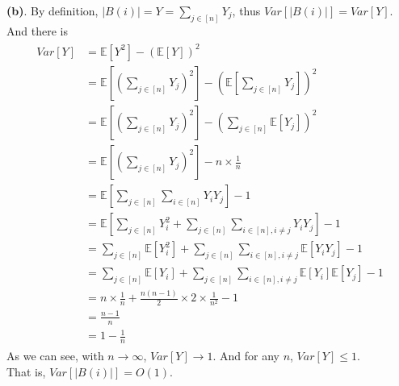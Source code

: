 \documentclass[titlepage, paper=a4, fontsize=11pt]{scrartcl} %
\numberwithin{equation}{section} %
\numberwithin{figure}{section} %
\numberwithin{table}{section} %
\begin{document}
\textbf{(b)}. By definition, $|B(i)| = Y = \sum_{j \in [n]} Y_j$, thus $Var[|B(i)|] = Var[Y]$. And there is \\
\begin{align*} 
\begin{split}
Var[Y] &= \mathbb{E}[Y^2] - (\mathbb{E}[Y])^2 \\
&= \mathbb{E}[(\sum_{j \in [n]} Y_j)^2] - (\mathbb{E}[\sum_{j \in [n]} Y_j])^2 \\
&= \mathbb{E}[(\sum_{j \in [n]} Y_j)^2] - (\sum_{j \in [n]} \mathbb{E}[Y_j])^2 \\
&= \mathbb{E}[(\sum_{j \in [n]} Y_j)^2] - n \times \frac{1}{n} \\
&= \mathbb{E}[\sum_{j \in [n]}\sum_{i \in [n]} Y_iY_j] - 1 \\
&= \mathbb{E}[\sum_{j \in [n]} Y_i^2 + \sum_{j \in [n]}\sum_{i \in [n], i \neq j} Y_iY_j] - 1 \\
&= \sum_{j \in [n]}\mathbb{E}[Y_i^2] + \sum_{j \in [n]}\sum_{i \in [n], i \neq j}\mathbb{E}[Y_iY_j] -1 \\
&= \sum_{j \in [n]}\mathbb{E}[Y_i] + \sum_{j \in [n]}\sum_{i \in [n], i \neq j}\mathbb{E}[Y_i]\mathbb{E}[Y_j] -1 \\
&= n \times \frac{1}{n} + \frac{n(n-1)}{2} \times 2 \times \frac{1}{n^2} -1 \\
&= \frac{n-1}{n} \\
&= 1 - \frac{1}{n}
\end{split}					
\end{align*}
As we can see, with $n \to \infty$, $Var[Y] \to 1$. And for any $n$, $Var[Y] \leqslant 1$. \\
That is, $Var[|B(i)|] = O(1)$.
\\
\end{document}
